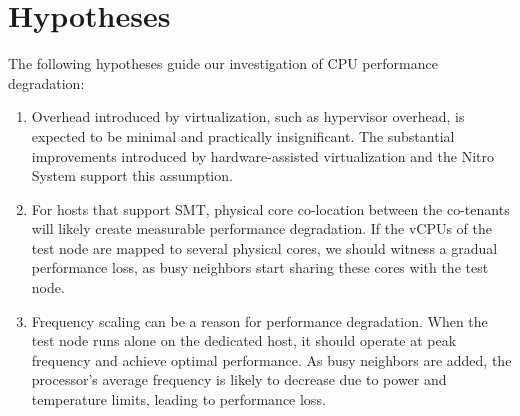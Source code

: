 \section{Hypotheses}
The following hypotheses guide our investigation of CPU performance degradation:

\begin{enumerate}[label=H\arabic*:, leftmargin=*, align=left]
    \item Overhead introduced by virtualization, such as hypervisor overhead, is expected 
    to be minimal and practically insignificant. The substantial improvements introduced 
    by hardware-assisted virtualization and the Nitro System support this assumption.

    \item For hosts that support \ac{SMT}, physical core co-location between the 
    co-tenants will likely create measurable performance degradation. If the vCPUs of the 
    test node are mapped to several physical cores, we should witness a gradual performance 
    loss, as busy neighbors start sharing these cores with the test node.

    \item Frequency scaling can be a reason for performance degradation.  
    When the test node runs alone on the dedicated host, it should operate at peak frequency and 
    achieve optimal performance. As busy neighbors are added, the processor's average frequency
    is likely to decrease due to power and temperature limits, leading to performance loss.
\end{enumerate}
